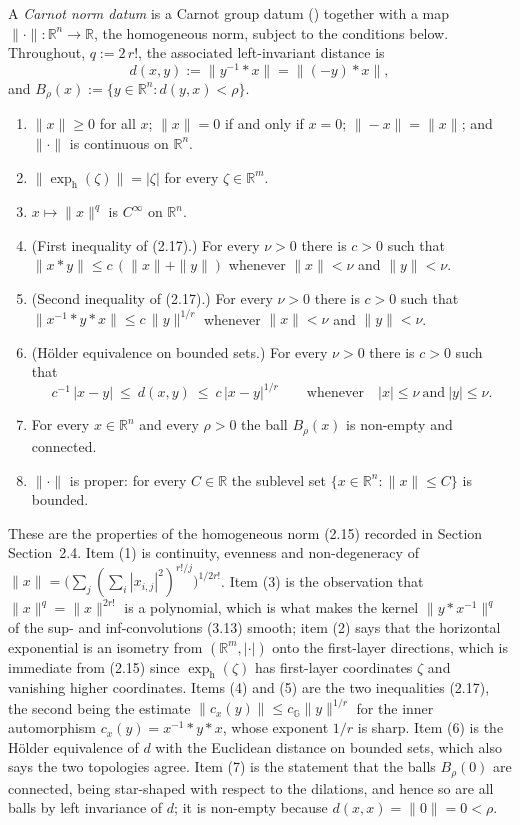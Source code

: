 \begin{definition}
A \emph{Carnot norm datum} is a Carnot group datum () together with a
map $\|\cdot\|:\mathbb R^n\to\mathbb R$, the homogeneous norm, subject to the conditions
below. Throughout, $q:=2\,r!$, the associated left-invariant distance is
\[
 d(x,y):=\|y^{-1}*x\|=\|(-y)*x\|,
\]
and $B_\rho(x):=\{y\in\mathbb R^n: d(y,x)<\rho\}$.
\begin{enumerate}
\item $\|x\|\ge0$ for all $x$; $\|x\|=0$ if and only if $x=0$; $\|-x\|=\|x\|$; and
  $\|\cdot\|$ is continuous on $\mathbb R^n$.
\item $\|\exp_{\mathrm h}(\zeta)\|=|\zeta|$ for every $\zeta\in\mathbb R^m$.
\item $x\mapsto\|x\|^{q}$ is $C^\infty$ on $\mathbb R^n$.
\item (First inequality of (2.17).) For every $\nu>0$ there is $c>0$ such that
  $\|x*y\|\le c\,(\|x\|+\|y\|)$ whenever $\|x\|<\nu$ and $\|y\|<\nu$.
\item (Second inequality of (2.17).) For every $\nu>0$ there is $c>0$ such that
  $\|x^{-1}*y*x\|\le c\,\|y\|^{1/r}$ whenever $\|x\|<\nu$ and $\|y\|<\nu$.
\item (H\"older equivalence on bounded sets.) For every $\nu>0$ there is $c>0$ such that
  \[
   c^{-1}\,|x-y|\ \le\ d(x,y)\ \le\ c\,|x-y|^{1/r}
   \qquad\text{whenever}\quad |x|\le\nu\ \text{and}\ |y|\le\nu .
  \]
\item For every $x\in\mathbb R^n$ and every $\rho>0$ the ball $B_\rho(x)$ is non-empty and
  connected.
\item $\|\cdot\|$ is proper: for every $C\in\mathbb R$ the sublevel set
  $\{x\in\mathbb R^n:\|x\|\le C\}$ is bounded.
\end{enumerate}

These are the properties of the homogeneous norm (2.15) recorded in Section
Section~2.4. Item (1) is continuity, evenness and non-degeneracy of
$\|x\|=\big(\sum_{j}(\sum_i|x_{i,j}|^2)^{r!/j}\big)^{1/2r!}$. Item (3) is the observation
that $\|x\|^{q}=\|x\|^{2r!}$ is a polynomial, which is what makes the kernel
$\|y*x^{-1}\|^{q}$ of the sup- and inf-convolutions (3.13) smooth; item (2) says
that the horizontal exponential is an isometry from $(\mathbb R^m,|\cdot|)$ onto the
first-layer directions, which is immediate from (2.15) since
$\exp_{\mathrm h}(\zeta)$ has first-layer coordinates $\zeta$ and vanishing higher
coordinates. Items (4) and (5) are the two inequalities (2.17), the second being the
estimate $\|c_x(y)\|\le c_{\mathbb G}\|y\|^{1/r}$ for the inner automorphism
$c_x(y)=x^{-1}*y*x$, whose exponent $1/r$ is sharp. Item (6) is the H\"older equivalence of
$d$ with the Euclidean distance on bounded sets, which also says the two topologies agree.
Item (7) is the statement that the balls $B_\rho(0)$ are connected, being star-shaped with
respect to the dilations, and hence so are all balls by left invariance of $d$; it is
non-empty because $d(x,x)=\|0\|=0<\rho$.


\end{definition}
